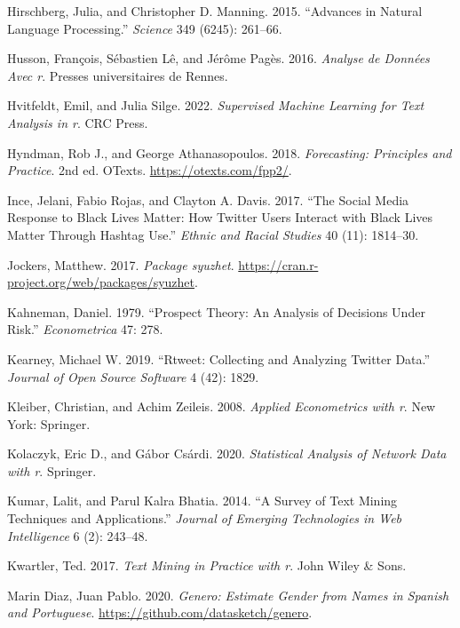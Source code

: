 \documentclass[
]{interact}
\newlength{\cslhangindent}
\newenvironment{CSLReferences}[2] %
 {\begin{list}{}{%
  \setlength{\itemindent}{0pt}
  \setlength{\leftmargin}{0pt}
  \setlength{\parsep}{0pt}
  \ifodd #1
   \setlength{\leftmargin}{\cslhangindent}
   \setlength{\itemindent}{-1\cslhangindent}
  \fi
  \setlength{\itemsep}{#2\baselineskip}}}
 {\end{list}}
\begin{document}
\begin{CSLReferences}{1}{0}
Hirschberg, Julia, and Christopher D. Manning. 2015. {``Advances in
Natural Language Processing.''} \emph{Science} 349 (6245): 261--66.

Husson, François, Sébastien Lê, and Jérôme Pagès. 2016. \emph{Analyse de
Donn{é}es Avec r}. Presses universitaires de Rennes.

Hvitfeldt, Emil, and Julia Silge. 2022. \emph{Supervised Machine
Learning for Text Analysis in r}. CRC Press.

Hyndman, Rob J., and George Athanasopoulos. 2018. \emph{Forecasting:
Principles and Practice}. 2nd ed. OTexts.
\url{https://otexts.com/fpp2/}.

Ince, Jelani, Fabio Rojas, and Clayton A. Davis. 2017. {``The Social
Media Response to Black Lives Matter: How Twitter Users Interact with
Black Lives Matter Through Hashtag Use.''} \emph{Ethnic and Racial
Studies} 40 (11): 1814--30.

Jockers, Matthew. 2017. \emph{Package {syuzhet}}.
\url{https://cran.r-project.org/web/packages/syuzhet}.

Kahneman, Daniel. 1979. {``Prospect Theory: An Analysis of Decisions
Under Risk.''} \emph{Econometrica} 47: 278.

Kearney, Michael W. 2019. {``Rtweet: Collecting and Analyzing Twitter
Data.''} \emph{Journal of Open Source Software} 4 (42): 1829.

Kleiber, Christian, and Achim Zeileis. 2008. \emph{Applied Econometrics
with r}. New York: Springer.

Kolaczyk, Eric D., and Gábor Csárdi. 2020. \emph{Statistical Analysis of
Network Data with r}. Springer.

Kumar, Lalit, and Parul Kalra Bhatia. 2014. {``A Survey of Text Mining
Techniques and Applications.''} \emph{Journal of Emerging Technologies
in Web Intelligence} 6 (2): 243--48.

Kwartler, Ted. 2017. \emph{Text Mining in Practice with r}. John Wiley
\& Sons.

Marin Diaz, Juan Pablo. 2020. \emph{Genero: Estimate Gender from Names
in Spanish and Portuguese}. \url{https://github.com/datasketch/genero}.


\end{CSLReferences}
\end{document}
